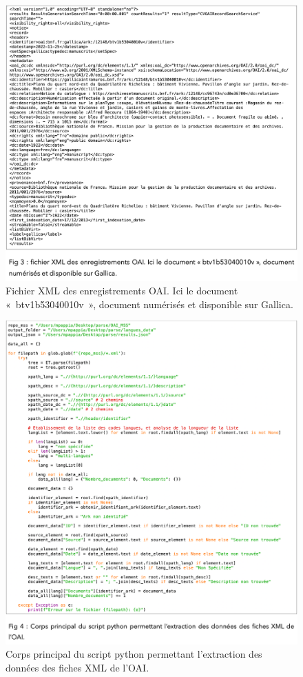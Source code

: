 \documentclass[a4paper,12pt,twoside]{book}
\begin{document}
\begin{figure}
	\centering
	\includegraphics[width=0.7\linewidth]{images/fiche_xml_oai}
	\caption{Fichier XML des enregistrements OAI. Ici le document « btv1b53040010v », document numérisés et disponible sur Gallica.}
	\label{fig:fichexmloai}
\end{figure}

\begin{figure}
	\centering
	\includegraphics[width=0.7\linewidth]{images/script_python_a}
	\caption{Corps principal du script python permettant l’extraction des données des fiches XML de l’OAI.}
	\label{fig:scriptpythona}
\end{figure}
\end{document}
